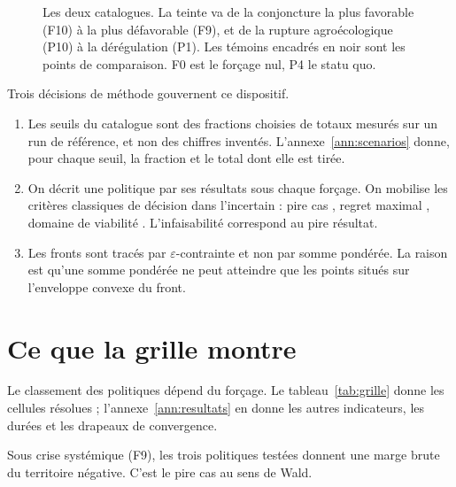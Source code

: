 \begin{figure}[h]
  \caption{Les deux catalogues. La teinte va de la
  conjoncture la plus favorable (F10) à la plus défavorable (F9), et de la rupture
  agroécologique (P10) à la dérégulation (P1). Les témoins encadrés en noir
  sont les points de comparaison. F0 est le forçage nul, P4 le statu quo.}
  \label{fig:spectre}
\end{figure}

Trois décisions de méthode gouvernent ce dispositif.

\begin{enumerate}[leftmargin=1.6em,itemsep=8pt]

\item Les seuils du catalogue sont des fractions choisies de totaux mesurés sur un run de
référence, et non des chiffres inventés. L'annexe~\ref{ann:scenarios} donne, pour chaque seuil,
la fraction et le total dont elle est tirée.

\item On décrit une politique par ses résultats sous chaque forçage. On mobilise les 
critères classiques de décision dans l'incertain : pire cas \parencite{wald1945}, 
regret maximal \parencite{savage1951}, domaine de viabilité \parencite{starr1963}. L'infaisabilité correspond au pire résultat.

\item Les fronts sont tracés par $\varepsilon$-contrainte \parencite{haimes1971,mavrotas2009} et
non par somme pondérée. La raison est qu'une somme pondérée ne peut atteindre que les points
situés sur l'enveloppe convexe du front.

\end{enumerate}



\section{Ce que la grille montre}
\label{sec:grille}

Le classement des politiques dépend du forçage. Le tableau~\ref{tab:grille} donne les cellules
résolues ; l'annexe~\ref{ann:resultats} en donne les autres indicateurs, les durées et les
drapeaux de convergence.

Sous crise systémique (F9), les trois politiques testées donnent une marge brute du territoire
négative. C'est le pire cas au sens de Wald.

